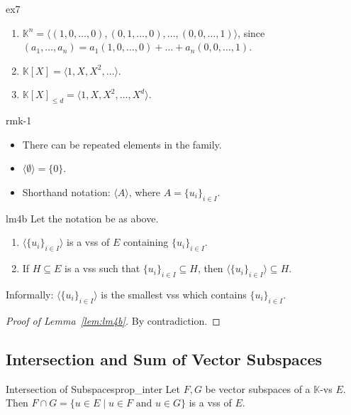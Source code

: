 \documentclass[11pt, a4paper]{article}
\newcommand{\K}{\mathbb{K}}
\begin{document}
\begin{example}{}{ex7}
  \begin{enumerate}
    \item $\K^n = \langle (1,0,\dots,0), (0,1,\dots,0), \dots, (0,0,\dots,1) \rangle$, since $(a_1, \dots, a_n) = a_1(1,0,\dots,0) + \dots + a_n(0,0,\dots,1)$.
    \item $\K[X] = \langle 1, X, X^2, \dots \rangle$.
    \item $\K[X]_{\le d} = \langle 1, X, X^2, \dots, X^d \rangle$.
  \end{enumerate}
\end{example}

\begin{remark}{}{rmk-1}
  \begin{itemize}
    \item There can be repeated elements in the family.
    \item $\langle \emptyset \rangle = \{0\}$.
    \item Shorthand notation: $\langle A \rangle$, where $A = \{u_i\}_{i \in I}$.
  \end{itemize}
\end{remark}

\begin{lemma}{}{lm4b}
  Let the notation be as above.
  \begin{enumerate}
    \item $\langle \{u_i\}_{i \in I} \rangle$ is a vss of $E$ containing $\{u_i\}_{i \in I}$.
    \item If $H \subseteq E$ is a vss such that $\{u_i\}_{i \in I} \subseteq H$, then $\langle \{u_i\}_{i \in I} \rangle \subseteq H$.
  \end{enumerate}
  Informally: $\langle \{u_i\}_{i \in I} \rangle$ is the smallest vss which contains $\{u_i\}_{i \in I}$.
\end{lemma}

\begin{proof}[Proof of Lemma~\ref{lem:lm4b}]
  By contradiction.  
\end{proof}

\subsection{Intersection and Sum of Vector Subspaces}

\begin{proposition}{Intersection of Subspaces}{prop_inter}
  Let $F, G$ be vector subspaces of a $\K$-vs $E$. Then $F \cap G = \{u \in E \mid u \in F \text{ and } u \in G\}$ is a vss of $E$.
\end{proposition}
\end{document}
